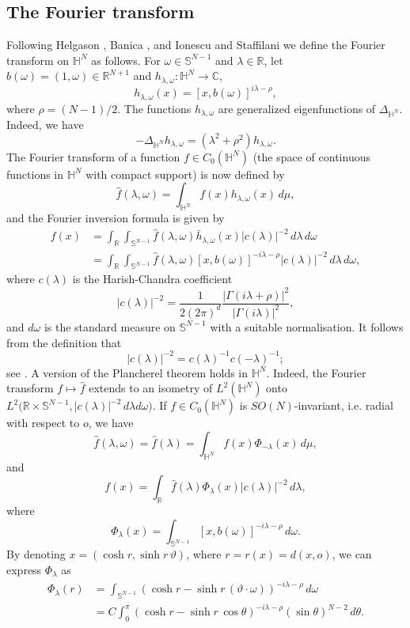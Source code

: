 \documentclass[10pt,leqno]{amsart}
\numberwithin{equation}{section}
\newcommand{\field}[1]{\mathbb{#1}}
\newcommand{\R}{\field{R}}          		%
\newcommand{\Sph}{\field{S}}        		%
\newcommand{\C}{\field{C}}          		%
\newcommand{\Hy}{\field{H}}
\begin{document}
\subsection{The Fourier transform}
Following Helgason \cite{helga}, Banica \cite{banica2007}, and Ionescu and Staffilani \cite{IS2009} we define the Fourier transform on $\Hy^N$ as follows. For $\omega\in\Sph^{N-1}$ and $\lambda\in\R$, let $b(\omega)=(1,\omega)\in\R^{N+1}$ and $h_{\lambda,\omega}\colon\Hy^N\to\C$,
\[
h_{\lambda,\omega}(x)=[x,b(\omega)]^{i\lambda-\rho},
\]
where $\rho=(N-1)/2$. The functions $h_{\lambda,\omega}$ are generalized eigenfunctions of $\Delta_{\Hy^N}$. Indeed, we have
\[
-\Delta_{\Hy^N} h_{\lambda,\omega} = \left(\lambda^2 + \rho^2\right)h_{\lambda,\omega}.
\]
The Fourier transform of a function $f\in C_0(\Hy^N)$ (the space of continuous functions in $\Hy^N$ with compact support) is now defined by
\[
\hat{f}(\lambda,\omega)=\int_{\Hy^N}f(x)h_{\lambda,\omega}(x)\,d\mu,
\]
and the Fourier inversion formula is given by
\begin{align*}
f(x)&=\int_{\R}\int_{\Sph^{N-1}}\hat{f}(\lambda,\omega)\bar{h}_{\lambda,\omega}(x)
|c(\lambda)|^{-2}\,d\lambda\,d\omega\\
&=\int_{\R}\int_{\Sph^{N-1}}\hat{f}(\lambda,\omega)[x,b(\omega)]^{-i\lambda-\rho}|c(\lambda)|^{-2}\,d\lambda\,d\omega,
\end{align*}
where $c(\lambda)$ is the Harish-Chandra coefficient
\[
|c(\lambda)|^{-2}=\frac{1}{2(2\pi)^d}\frac{|\Gamma(i\lambda+\rho)|^2}{|\Gamma(i\lambda)|^2},
\]
and $d\omega$ is the standard measure on 
$\Sph^{N-1}$ with a suitable normalisation. It follows from the definition that 
\begin{equation}\label{cl-2}
|c(\lambda)|^{-2}=c(\lambda)^{-1}c(-\lambda)^{-1};
\end{equation}
 see \cite[Prop. A1]{I-JFA2000}. A version of the  Plancherel theorem holds in $\Hy^N$. Indeed, the Fourier transform $f\mapsto\hat{f}$ extends to an isometry of $L^2(\Hy^N)$ onto $L^2\big(\R\times\Sph^{N-1},|c(\lambda)|^{-2}\,d\lambda d\omega\big)$.  
If $f\in C_0(\Hy^N)$ is $SO(N)$-invariant, i.e. radial with respect to $o$, we have
\[
\hat{f}(\lambda,\omega)=\hat{f}(\lambda)
=\int_{\Hy^N}f(x)\Phi_{-\lambda}(x)\,d\mu,
\]
and
\[
f(x)=\int_{\R} \hat{f}(\lambda)\Phi_\lambda (x)|c(\lambda)|^{-2}\,d\lambda,
\]
where 
\begin{equation}
\label{defPhi}
\Phi_\lambda (x)=\int_{\Sph^{N-1}}[x,b(\omega)]^{-i\lambda-\rho}\,d\omega.
\end{equation}
By denoting $x=(\cosh r,\sinh r\,\vartheta)$, where $r=r(x)=d(x,o)$, we can express $\Phi_\lambda$ as
\begin{align*}
\Phi_\lambda(r)&=\int_{\Sph^{N-1}} \left(\cosh r-\sinh r\,(\vartheta\cdot\omega)\right)^{-i\lambda-\rho}\,d\omega\\
&=C\int_0^\pi  \left(\cosh r-\sinh r\,\cos\theta\right)^{-i\lambda-\rho}(\sin\theta)^{N-2}\,d\theta.
\end{align*}
\end{document}

